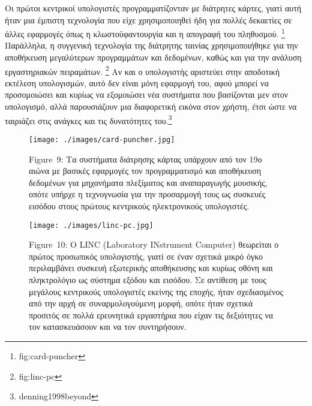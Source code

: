 \documentclass[
]{article}
\begin{document}
Οι πρώτοι κεντρικοί υπολογιστές προγραμματίζονταν με διάτρητες κάρτες,
γιατί αυτή ήταν μια έμπιστη τεχνολογία που είχε χρησιμοποιηθεί ήδη για
πολλές δεκαετίες σε άλλες εφαρμογές όπως η κλωστοϋφαντουργία και η
απογραφή του πληθυσμού. \footnote{fig:card-puncher} Παράλληλα, η
συγγενική τεχνολογία της διάτρητης ταινίας χρησιμοποιήθηκε για την
αποθήκευση μεγαλύτερων προγραμμάτων και δεδομένων, καθώς και για την
ανάλυση εργαστηριακών πειραμάτων. \footnote{fig:linc-pc} Αν και ο
υπολογιστής αριστεύει στην αποδοτική εκτέλεση υπολογισμών, αυτό δεν
είναι μόνη εφαρμογή του, αφού μπορεί να προσομοιώσει και κυρίως να
εξομοιώσει νέα συστήματα που βασίζονται μεν στον υπολογισμό, αλλά
παρουσιάζουν μια διαφορετική εικόνα στον χρήστη, έτσι ώστε να ταιριάζει
στις ανάγκες και τις δυνατότητες του.\footnote{denning1998beyond}

\leavevmode{}%
\begin{figure}
\hypertarget{fig:card-puncher}{%
\centering
\texttt{[image: ./images/card-puncher.jpg]}
\caption{Figure~9: Τα συστήματα διάτρησης κάρτας υπάρχουν από τον 19ο
αιώνα με βασικές εφαρμογές τον προγραμματισμό και αποθήκευση δεδομένων
για μηχανήματα πλεξίματος και αναπαραγωγής μουσικής, οπότε υπήρχε η
τεχνογνωσία για την προσαρμογή τους ως συσκευές εισόδου στους πρώτους
κεντρικούς ηλεκτρονικούς υπολογιστές.}\label{fig:card-puncher}
}
\end{figure}

\leavevmode{}%
\begin{figure}
\hypertarget{fig:linc-pc}{%
\centering
\texttt{[image: ./images/linc-pc.jpg]}
\caption{Figure~10: O LINC (Laboratory INstrument Computer) θεωρείται ο
πρώτος προσωπικός υπολογιστής, γιατί σε έναν σχετικά μικρό όγκο
περιλαμβάνει συσκευή εξωτερικής αποθήκευσης και κυρίως οθόνη και
πληκτρολόγιο ως σύστημα εξόδου και εισόδου. Σε αντίθεση με τους μεγάλους
κεντρικούς υπολογιστές εκείνης της εποχής, ήταν σχεδιασμένος από την
αρχή σε συναρμολογούμενη μορφή, οπότε ήταν σχετικά προσιτός σε πολλά
ερευνητικά εργαστήρια που είχαν τις δεξιότητες να τον κατασκευάσουν και
να τον συντηρήσουν.}\label{fig:linc-pc}
}
\end{figure}
\end{document}
